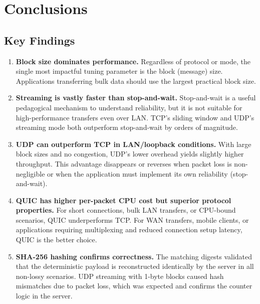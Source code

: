 \documentclass[12pt,a4paper]{article}
\begin{document}
\section{Conclusions}
\label{sec:conclusions}

\subsection{Key Findings}

\begin{enumerate}
  \item \textbf{Block size dominates performance.}  Regardless of protocol or
        mode, the single most impactful tuning parameter is the block (message)
        size.  Applications transferring bulk data should use the largest
        practical block size.

  \item \textbf{Streaming is vastly faster than stop-and-wait.}  Stop-and-wait
        is a useful pedagogical mechanism to understand reliability, but it is
        not suitable for high-performance transfers even over LAN.  TCP's
        sliding window and UDP's streaming mode both outperform stop-and-wait
        by orders of magnitude.

  \item \textbf{UDP can outperform TCP in LAN/loopback conditions.}  With
        large block sizes and no congestion, UDP's lower overhead yields
        slightly higher throughput.  This advantage disappears or reverses
        when packet loss is non-negligible or when the application must
        implement its own reliability (stop-and-wait).

  \item \textbf{QUIC has higher per-packet CPU cost but superior protocol
        properties.}  For short connections, bulk LAN transfers, or CPU-bound
        scenarios, QUIC underperforms TCP.  For WAN transfers, mobile clients,
        or applications requiring multiplexing and reduced connection setup
        latency, QUIC is the better choice.

  \item \textbf{SHA-256 hashing confirms correctness.}  The matching digests
        validated that the deterministic payload is reconstructed identically
        by the server in all non-lossy scenarios.  UDP streaming with 1-byte
        blocks caused hash mismatches due to packet loss, which was
        expected and confirms the counter logic in the server.
\end{enumerate}
\end{document}
